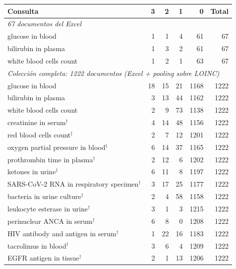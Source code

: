 \begin{tabular}{lrrrrr}
\toprule
Consulta & 3 & 2 & 1 & 0 & Total \\
\midrule
\multicolumn{6}{l}{\emph{67 documentos del Excel}} \\
glucose in blood & 1 & 1 & 4 & 61 & 67 \\
bilirubin in plasma & 1 & 3 & 2 & 61 & 67 \\
white blood cells count & 1 & 2 & 1 & 63 & 67 \\
\midrule
\multicolumn{6}{l}{\emph{Colección completa: 1222 documentos (Excel + pooling sobre LOINC)}} \\
glucose in blood & 18 & 15 & 21 & 1168 & 1222 \\
bilirubin in plasma & 3 & 13 & 44 & 1162 & 1222 \\
white blood cells count & 2 & 9 & 73 & 1138 & 1222 \\
creatinine in serum$^\dagger$ & 4 & 14 & 48 & 1156 & 1222 \\
red blood cells count$^\dagger$ & 2 & 7 & 12 & 1201 & 1222 \\
oxygen partial pressure in blood$^\dagger$ & 6 & 14 & 37 & 1165 & 1222 \\
prothrombin time in plasma$^\dagger$ & 2 & 12 & 6 & 1202 & 1222 \\
ketones in urine$^\dagger$ & 6 & 11 & 8 & 1197 & 1222 \\
SARS-CoV-2 RNA in respiratory specimen$^\dagger$ & 3 & 17 & 25 & 1177 & 1222 \\
bacteria in urine culture$^\dagger$ & 2 & 4 & 58 & 1158 & 1222 \\
leukocyte esterase in urine$^\dagger$ & 3 & 1 & 3 & 1215 & 1222 \\
perinuclear ANCA in serum$^\dagger$ & 6 & 8 & 0 & 1208 & 1222 \\
HIV antibody and antigen in serum$^\dagger$ & 1 & 22 & 16 & 1183 & 1222 \\
tacrolimus in blood$^\dagger$ & 3 & 6 & 4 & 1209 & 1222 \\
EGFR antigen in tissue$^\dagger$ & 2 & 1 & 13 & 1206 & 1222 \\
\bottomrule
\end{tabular}
